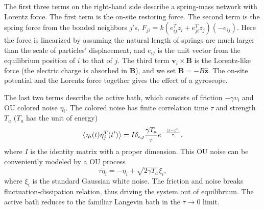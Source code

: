 \documentclass[
 preprint,
 preprintnumbers,
 amsmath,amssymb,
 aps,
 pre,
 longbibliography,
 10pt, twocolumn
]{revtex4-1}
\begin{document}
The first three terms on the right-hand side describe a spring-mass network with Lorentz force. 
The first term is the on-site restoring force.
The second term is the spring force from the bonded neighbors $j$'s,
$F_{ji} = k (e_{ij}^T z_i + e_{ji}^T z_j) (-e_{ij})$.
Here the force is linearized by assuming the natural length of springs are much larger than the scale of particles' displacement, and $e_{ij}$ is the unit vector from the equilibrium position of $i$ to that of $j$.
The third term $\bm{v}_i\times\bm{B}$ is the Lorentz-like force (the electric charge is absorbed in $\bm{B}$), and we set $\bm{B} = -B\mathbf{\hat{z}}$. 
The on-site potential and the Lorentz force together gives the effect of a gyroscope.

The last two terms describe the active bath, which consists of friction $-\gamma v_i$ and OU colored noise $\eta_i$.
The colored noise has finite correlation time $\tau$ and strength $T_a$ ($T_a$ has the unit of energy)
\begin{equation} \label{eqn:noise_correlation}
    \expval{\eta_i(t)\eta_{j}^T(t')} = I\delta_{i,j}\frac{\gamma T_a}{\tau} e^{-\frac{|t-t'|}{\tau}} ,
\end{equation}
where $I$ is the identity matrix with a proper dimension.
This OU noise can be conveniently modeled by a OU process \cite{Hanggi1994ColoredSystems}
\begin{equation} \label{eqn:noise_eom}
    \tau \dot{\eta}_i = -\eta_i + \sqrt{2\gamma T_a}\xi_i ,
\end{equation}
where $\xi_i$ is the standard Gaussian white noise.
The friction and noise breaks fluctuation-dissipation relation, thus driving the system out of equilibrium.
The active bath reduces to the familiar Langevin bath in the $\tau \rightarrow 0$ limit.
\end{document}

